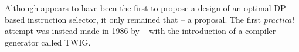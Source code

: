 {Although \citeauthor{Ripken1977} appears to have been the first to propose a
design of an optimal \gls{DP}-based \gls{instruction selector},
it only remained that -- a proposal.
%
The first \emph{practical} attempt was
instead made in 1986 by \citeauthor{Aho1989}~\cite{Aho1985, Tjiang1986, Aho1989}
with the introduction of a \gls{compiler} generator called \gls{TWIG}.


\subsubsection{}

%
%

}
